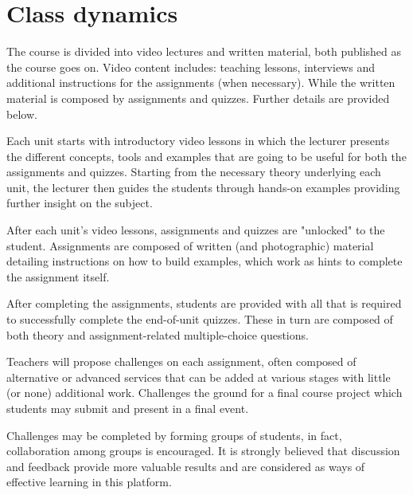 \documentclass{tufte-book} %
\begin{document}
\section{Class dynamics}

The course is divided into video lectures and written material, both published as the course goes on. Video content includes: teaching lessons, interviews and additional instructions for the assignments (when necessary). While the written material is composed by assignments and quizzes. Further details are provided below.

Each unit starts with introductory video lessons in which the lecturer presents the different concepts, tools and examples that are going to be useful for both the assignments and quizzes.
Starting from the necessary theory underlying each unit, the lecturer then guides the students through hands-on examples providing further insight on the subject.

After each unit's video lessons, assignments and quizzes are "unlocked" to the student. Assignments are composed of written (and photographic) material detailing instructions on how to build examples, which work as hints to complete the assignment itself.

After completing the assignments, students are provided with all that is required to successfully complete the end-of-unit quizzes. These in turn are composed of both theory and assignment-related multiple-choice questions.

Teachers will propose challenges on each assignment, often composed of alternative or advanced services that can be added at various stages with little (or none) additional work. Challenges the ground for a final course project which students may submit and present in a final event.

Challenges may be completed by forming groups of students, in fact, collaboration among groups is encouraged. It is strongly believed that discussion and feedback provide more valuable results and are considered as ways of effective learning in this platform.

\end{document}
